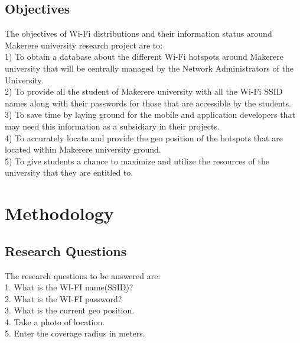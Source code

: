 \documentclass[14pt, a4paper]{article}
\begin{document}
				\subsection{Objectives}

The objectives of Wi-Fi distributions and their information status around Makerere university research project are to:\\


1)	To obtain a database about the different Wi-Fi hotspots around Makerere university that will be centrally managed by the Network Administrators of the University.\\


2)	To provide all the student of Makerere university with all the Wi-Fi SSID names along with their passwords for those that are accessible by the students.\\

3)	To save time by laying ground for the mobile and application developers that may need this information as a subsidiary in their projects.\\

4)	To accurately locate and provide the geo position of the hotspots that are located within Makerere university ground.\\

5)	To give students a chance to maximize and utilize the resources of the university that they are entitled to.\\

				\section{Methodology}

				\subsection{Research Questions}

The research questions to be answered are:\\

1.	What is the WI-FI name(SSID)?\\

2.	What is the WI-FI password?\\

3.	What is the current geo position.\\

4.	Take a photo of location.\\

5.	Enter the coverage radius in meters.\\
\end{document}
